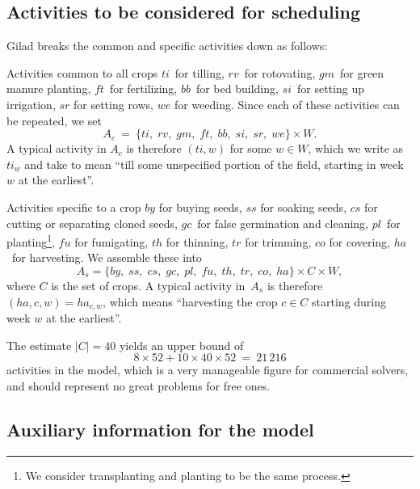 \documentclass[11pt,reqno]{amsart}
\numberwithin{equation}{section}
\begin{document}
\subsection{Activities to be considered for scheduling}

Gilad breaks the common and specific activities down as follows:

\begin{mydesc}
\item[Activities common to all crops] $ti$~for tilling, $rv$~for rotovating, $gm$~for
  green manure planting, $f\!t$~for fertilizing, $bb$~for bed building, $si$~for setting
  up irrigation, $sr$ for setting rows, $we$ for weeding. Since each of these activities
  can be repeated, we set
  \[
     A_c 
     \ = \
     \{ ti,\;rv,\;gm,\;f\!t,\;bb,\;si,\;sr,\;we\} \times W.
  \]
  A typical activity in $A_c$ is therefore $(ti,w)$ for some $w\in W$, which we
  write as $ti_{w}$ and take to mean ``till some unspecified portion of the field,
  starting in week $w$ at the earliest''.


\item[Activities specific to a crop] $by$ for buying seeds, $ss$ for soaking seeds, $cs$
  for cutting or separating cloned seeds, $gc$~for false germination and cleaning,
  $pl$~for planting\footnote{We consider transplanting and planting to be the same
    process.}, $f\!u$ for fumigating, $th$ for thinning, $tr$ for
  trimming, $co$ for covering, $ha$~for harvesting. We assemble these into
  \[
     A_s = \{ by,\;ss,\;cs,\;gc,\;pl,\;f\!u,\;th,\;tr,\;co,\;ha\} \times C\times W,
  \]
  where $C$ is the set of crops. A typical activity in~$A_s$ is
  therefore $(ha,c, w)=ha_{c, w}$, which means ``harvesting the crop
  $c\in C$ starting during week $w$ at the earliest''.
\end{mydesc}

The estimate $|C|=40$ yields an upper bound of
\[
    8\times 52 + 10\times 40 \times 52
    \ = \
    21\,216
\]
activities in the model, which is a very manageable figure for
commercial solvers, and should represent no great problems for free
ones.

\subsection{Auxiliary information for the model}
\end{document}
